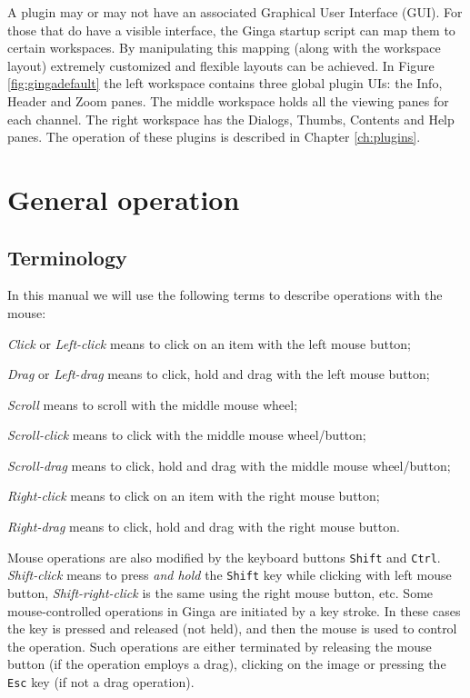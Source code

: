 \documentclass[11pt]{report}
\begin{document}
A plugin may or may not have an associated Graphical User Interface (GUI).
For those that do have a visible interface, the Ginga startup script
can map them to certain workspaces.  By manipulating this mapping (along
with the workspace layout) extremely customized and flexible layouts can
be achieved.  
In Figure \ref{fig:gingadefault} the left workspace contains three
global plugin UIs: the Info, Header and Zoom panes.  The middle workspace
holds all the viewing panes for each channel.  The right workspace has
the Dialogs, Thumbs, Contents and Help panes.  The operation of these
plugins is described in Chapter \ref{ch:plugins}. 

\section{General operation}
\label{sec:generalop}

\subsection{Terminology}
In this manual we will use the following terms to describe operations
with the mouse:
\begin{itemize*}
\item \emph{Click} or \emph{Left-click} means to click on an item with
  the left mouse button;
\item \emph{Drag} or \emph{Left-drag} means to click, hold and drag with
  the left mouse button;
\item \emph{Scroll} means to scroll with the middle mouse wheel;
\item \emph{Scroll-click} means to click with the middle mouse wheel/button;
\item \emph{Scroll-drag} means to click, hold and drag with the middle
  mouse wheel/button; 
\item \emph{Right-click} means to click on an item with the right mouse
  button; 
\item \emph{Right-drag} means to click, hold and drag with the right
  mouse button.
\end{itemize*}

Mouse operations are also modified by the keyboard buttons {\tt Shift}
and {\tt Ctrl}.  \emph{Shift-click} means to press \emph{and hold} the
{\tt Shift} key while clicking with left mouse button,
\emph{Shift-right-click} is the same using the right mouse button,
etc.
Some mouse-controlled operations in Ginga are initiated by a key stroke.
In these cases the key is pressed and released (not held), and then the
mouse is used to control the operation.  Such operations are either
terminated by releasing the mouse button (if the operation employs a
drag), clicking on the image or pressing the {\tt Esc} key (if not a
drag operation).
\end{document}

